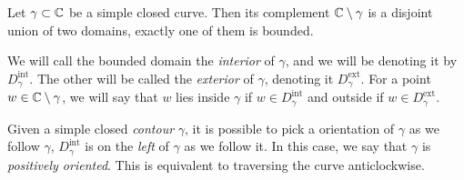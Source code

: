 \begin{theorem}
    Let $\gamma \subset \mathbb{C}$ be a simple closed curve.
    Then its complement $\mathbb{C} \setminus \gamma$ is a disjoint
    union of two domains, exactly one of them is bounded.
\end{theorem}

We will call the bounded domain the \emph{interior} of $\gamma$,
and we will be denoting it by $D_\gamma^\text{int}$.
The other will be called the \emph{exterior} of $\gamma$, denoting it
$D_\gamma^\text{ext}$. For a point $w \in \mathbb{C} \setminus \gamma$,
we will say that $w$ lies inside $\gamma$ if $w \in D^\text{int}_\gamma$
and outside if $w \in D_\gamma^\text{ext}$.

Given a simple closed \emph{contour} $\gamma$, it is possible to pick a
orientation of $\gamma$ as we follow $\gamma$, $D^\text{int}_\gamma$
is on the \emph{left} of $\gamma$ as we follow it.
In this case, we say that $\gamma$ is \emph{positively oriented}.
This is equivalent to traversing the curve anticlockwise.
